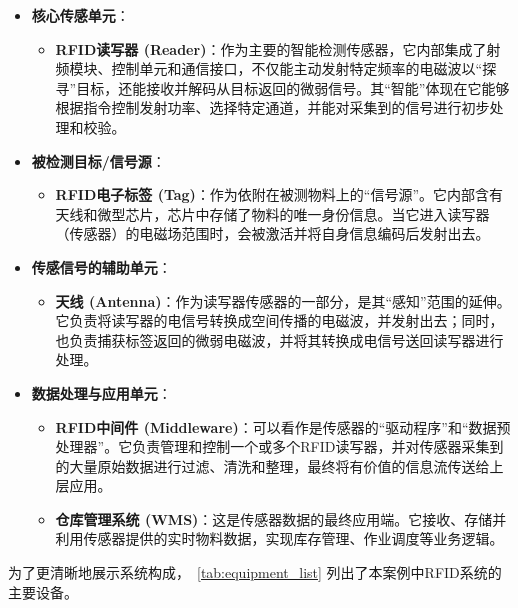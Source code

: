 \documentclass[a4paper, 12pt]{article}
\begin{document}
\begin{itemize}
    \item \textbf{核心传感单元}：
    \begin{itemize}
        \item \textbf{RFID读写器 (Reader)}：作为主要的智能检测传感器，它内部集成了射频模块、控制单元和通信接口，不仅能主动发射特定频率的电磁波以“探寻”目标，还能接收并解码从目标返回的微弱信号。其“智能”体现在它能够根据指令控制发射功率、选择特定通道，并能对采集到的信号进行初步处理和校验。
    \end{itemize}
    \item \textbf{被检测目标/信号源}：
    \begin{itemize}
        \item \textbf{RFID电子标签 (Tag)}：作为依附在被测物料上的“信号源”。它内部含有天线和微型芯片，芯片中存储了物料的唯一身份信息\cite{ref2}。当它进入读写器（传感器）的电磁场范围时，会被激活并将自身信息编码后发射出去。
    \end{itemize}
    \item \textbf{传感信号的辅助单元}：
    \begin{itemize}
        \item \textbf{天线 (Antenna)}：作为读写器传感器的一部分，是其“感知”范围的延伸。它负责将读写器的电信号转换成空间传播的电磁波，并发射出去；同时，也负责捕获标签返回的微弱电磁波，并将其转换成电信号送回读写器进行处理。
    \end{itemize}
    \item \textbf{数据处理与应用单元}：
    \begin{itemize}
        \item \textbf{RFID中间件 (Middleware)}：可以看作是传感器的“驱动程序”和“数据预处理器”。它负责管理和控制一个或多个RFID读写器，并对传感器采集到的大量原始数据进行过滤、清洗和整理，最终将有价值的信息流传送给上层应用。
        \item \textbf{仓库管理系统 (WMS)}：这是传感器数据的最终应用端。它接收、存储并利用传感器提供的实时物料数据，实现库存管理、作业调度等业务逻辑。
    \end{itemize}
\end{itemize}




为了更清晰地展示系统构成，\tablename~\ref{tab:equipment_list} 列出了本案例中RFID系统的主要设备。
\end{document}
